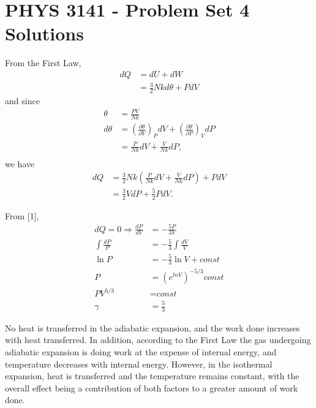 \documentclass[a4paper,12pt]{article}
\begin{document}
\section*{PHYS 3141 - Problem Set 4 Solutions}

\begin{enumerate}[label=\textbf{[\arabic*]}]
    \item
        From the First Law,
        \begin{align*}
            dQ &= dU + dW \\
            &= \frac{3}{2} Nk d\theta + P dV
        \end{align*}
        and since
        \begin{align*}
            \theta &= \frac{PV}{Nk} \\
            d\theta &= \left( \frac{\partial \theta}{\partial V} \right)_P dV + \left( \frac{\partial \theta}{\partial P} \right)_V dP \\
            &= \frac{P}{Nk} dV + \frac{V}{Nk} dP, \\ 
        \end{align*}
        we have
        \begin{align*}
            dQ &= \frac{3}{2} Nk \left( \frac{P}{Nk}dV + \frac{V}{Nk}dP \right) + P dV \\
            &= \frac{3}{2} V dP + \frac{5}{2} P dV.
        \end{align*}

    \item
        From [1],
        \begin{align*}
            dQ = 0 \Rightarrow \frac{dP}{dV} &= -\frac{5P}{3V} \\
            \int \frac{dP}{P} &= -\frac{5}{3} \int \frac{dV}{V} \\
            \ln{P} &= -\frac{5}{3} \ln{V} + \textit{const} \\
            P &= \left( e^{ln{V}} \right)^{-5/3} \textit{const} \\
            P V^{5/3} &= \textit{const} \\
            \gamma &= \frac{5}{3}
        \end{align*}

    \item
        No heat is transferred in the adiabatic expansion, and the work done increases with heat transferred. In addition, according to the First Law the gas undergoing adiabatic expansion is doing work at the expense of internal energy, and temperature decreases with internal energy. However, in the isothermal expansion, heat is transferred and the temperature remains constant, with the overall effect being a contribution of both factors to a greater amount of work done.
        

\end{enumerate}
\end{document}
